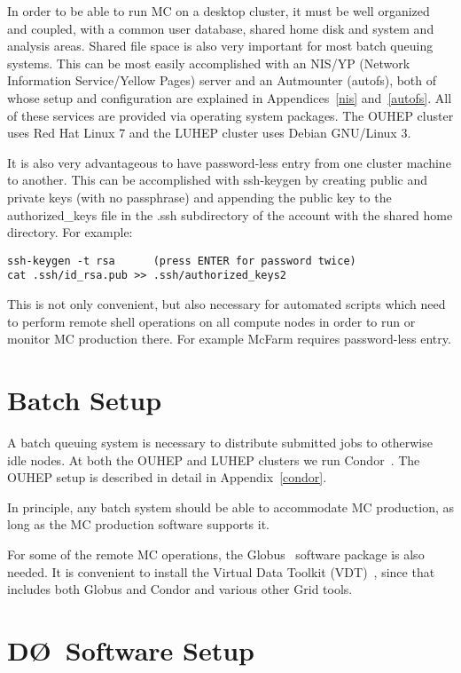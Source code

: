 \documentclass{revtex4}
\newcommand{\DO}{\mbox{D\O}}
\begin{document}
In order to be able to run MC on a desktop cluster, it must be
well organized and coupled, with a common user database, shared home disk 
and system and analysis areas. Shared file space is also very important for 
most batch queuing systems. This can be most easily accomplished with 
an NIS/YP (Network Information Service/Yellow Pages) server and an 
Autmounter (autofs), both of whose setup and configuration 
are explained in Appendices~\ref{nis} and~\ref{autofs}.  All of these
services are provided via operating system packages.  The OUHEP
cluster uses Red Hat Linux 7 and the LUHEP cluster uses Debian
GNU/Linux 3.

It is also very advantageous to have password-less entry from one
cluster machine to another.  This can be accomplished with ssh-keygen
by creating public and private keys (with no passphrase) and appending the
public key to the authorized\_keys file in the .ssh subdirectory of the
account with the shared home directory. For example:

\begin{verbatim}
ssh-keygen -t rsa      (press ENTER for password twice)
cat .ssh/id_rsa.pub >> .ssh/authorized_keys2
\end{verbatim}

This is not only convenient, but also necessary for automated scripts
which need to perform remote shell operations on all compute nodes in
order to run or monitor MC production there.  For example McFarm
requires password-less entry.

\section{Batch Setup}

A batch queuing system is necessary to distribute submitted jobs 
to otherwise idle nodes. At both the OUHEP and LUHEP clusters we run Condor~\cite{condor}. 
The OUHEP setup is described in detail in Appendix~\ref{condor}.

In principle, any batch system should be able to accommodate MC production,
as long as the MC production software supports it.

For some of the remote MC operations, the Globus~\cite{globus} 
software package is also needed. It is convenient to install 
the Virtual Data Toolkit (VDT)~\cite{vdt}, since that includes 
both Globus and Condor and various other Grid tools.

\section{\DO\ Software Setup}
\end{document}
